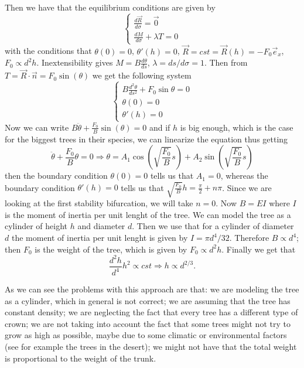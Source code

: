 \documentclass[10pt,a4paper]{book}
\begin{document}
Then we have that the equilibrium conditions are given by
$$\begin{cases}
\frac{d\vec{R}}{d\sigma}=\vec{0}\\
\frac{dM}{d\sigma}+\lambda T=0
\end{cases}$$
with the conditions that $\theta(0)=0$, $\theta'(h)=0$, $\vec{R}=cst=\vec{R}(h)=-F_0\vec{e}_x$, $F_0\propto d^2h$. Inextensibility gives $M=B\frac{d\theta}{ds}$, $\lambda=ds/d\sigma=1$. Then from $T=\vec{R}\cdot\vec{n}=F_0\sin(\theta)$ we get the following system
$$\begin{cases}
B\frac{d^2\theta}{ds^2}+F_0\sin\theta=0\\
\theta(0)=0\\
\theta'(h)=0
\end{cases}$$
Now we can write $B\ddot{\theta}+\frac{F_0}{B}\sin(\theta)=0$ and if  $h$ is big enough, which is the case for the biggest trees in their species, we can linearize the equation thus getting 
$$\ddot{\theta}+\frac{F_0}{B}\theta=0\Rightarrow \theta=A_1\cos(\sqrt{\frac{F_0}{B}}s)+A_2\sin(\sqrt{\frac{F_0}{B}}s)$$then the boundary condition $\theta(0)=0$ tells us that $A_1=0$, whereas the boundary condition $\theta'(h)=0$ tells us that $\sqrt{\frac{F_0}{B}}h=\frac{\pi}{2}+n\pi$. Since we are looking at the first stability bifurcation, we will take $n=0$. Now $B=EI$ where $I$ is the moment of inertia per unit lenght of the tree. We can model the tree as a cylinder of height $h$ and diameter $d$. Then we use that for a cylinder of diameter $d$ the moment of inertia per unit lenght is given by $I=\pi d^4/32$. Therefore $B\propto d^4$; then $F_0$ is the weight of the tree, which is given by $F_0\propto d^2h$. Finally we get that 
$$\frac{d^2h}{d^4}h^2\propto cst\Rightarrow h\propto d^{2/3}.$$


As we can see the problems with this approach are that: we are modeling the tree as a cylinder, which in general is not correct; we are assuming that the tree has constant density; we are neglecting the fact that every tree has a different type of crown; we are not taking into account the fact that some trees might not try to grow as high as possible, maybe due to some climatic or environmental factors (see for example the trees in the desert); we might not have that the total weight is proportional to the weight of the trunk.
\end{document}
